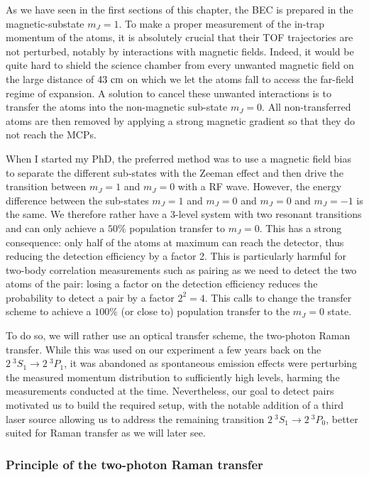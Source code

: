 \label{sec:raman}

As we have seen in the first sections of this chapter, the BEC is prepared in the magnetic-substate $m_J=1$. To make a proper measurement of the in-trap momentum of the atoms, it is absolutely crucial that their TOF trajectories are not perturbed, notably by interactions with magnetic fields. Indeed, it would be quite hard to shield the science chamber from every unwanted magnetic field on the large distance of $43 \ \rm{cm}$ on which we let the atoms fall to access the far-field regime of expansion. A solution to cancel these unwanted interactions is to transfer the atoms into the non-magnetic sub-state $m_J=0$. All non-transferred atoms are then removed by applying a strong magnetic gradient so that they do not reach the MCPs.

When I started my PhD, the preferred method was to use a magnetic field bias to separate the different sub-states with the Zeeman effect and then drive the transition between $m_J=1$ and $m_J=0$ with a RF wave. However, the energy difference between the sub-states $m_J=1$ and $m_J=0$ and $m_J=0$ and $m_J=-1$ is the same. We therefore rather have a 3-level system with two resonant transitions and can only achieve a $50\%$ population transfer to $m_J=0$. This has a strong consequence: only half of the atoms at maximum can reach the detector, thus reducing the detection efficiency by a factor 2. This is particularly harmful for two-body correlation measurements such as \kmk pairing as we need to detect the two atoms of the pair: losing a factor on the detection efficiency reduces the probability to detect a \kmk pair by a factor $2^2=4$. This calls to change the transfer scheme to achieve a $100\%$ (or close to) population transfer to the $m_J=0$ state.

To do so, we will rather use an optical transfer scheme, the two-photon Raman transfer. While this was used on our experiment a few years back on the $2 \ ^3 S_1 \rightarrow 2 \ ^3 P_1$, it was abandoned as spontaneous emission effects were perturbing the measured momentum distribution to sufficiently high levels, harming the measurements conducted at the time. Nevertheless, our goal to detect \kmk pairs motivated us to build the required setup, with the notable addition of a third laser source allowing us to address the remaining transition $2 \ ^3 S_1 \rightarrow 2 \ ^3 P_0$, better suited for Raman transfer as we will later see.


 

\subsubsection{Principle of the two-photon Raman transfer}

